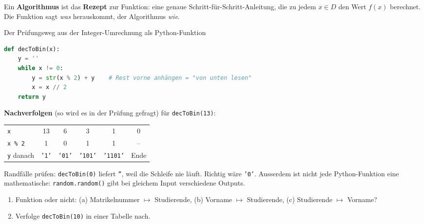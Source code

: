 \begin{merke}
  Ein \textbf{Algorithmus} ist das \textbf{Rezept} zur Funktion: eine genaue
  Schritt-für-Schritt-Anleitung, die zu jedem $x \in D$ den Wert $f(x)$ berechnet.
  Die Funktion sagt \emph{was} herauskommt, der Algorithmus \emph{wie}.
\end{merke}

\begin{beispiel}{Der Prüfungsweg aus der Integer-Umrechnung als Python-Funktion}
\begin{lstlisting}[language=Python]
def decToBin(x):
    y = ''
    while x != 0:
        y = str(x % 2) + y    # Rest vorne anhängen = "von unten lesen"
        x = x // 2
    return y
\end{lstlisting}
  \textbf{Nachverfolgen} (so wird es in der Prüfung gefragt) für \texttt{decToBin(13)}:\\[2pt]
  \begin{tabular}{lccccc}
    \toprule
    \texttt{x}          & 13 & 6 & 3 & 1 & 0 \\
    \texttt{x \% 2}     & 1 & 0 & 1 & 1 & -- \\
    \texttt{y} danach   & \texttt{'1'} & \texttt{'01'} & \texttt{'101'} & \texttt{'1101'} & Ende \\
    \bottomrule
  \end{tabular}
\end{beispiel}

\begin{fehler}
  Randfälle prüfen: \texttt{decToBin(0)} liefert \texttt{''}, weil die Schleife nie
  läuft. Richtig wäre \texttt{'0'}. Ausserdem ist nicht jede Python-Funktion eine
  mathematische: \texttt{random.random()} gibt bei gleichem Input verschiedene Outputs.
\end{fehler}

\begin{minicheck}
  \begin{enumerate}[resume*=fragen01]
    \item Funktion oder nicht: (a) Matrikelnummer $\mapsto$ Studierende,
          (b) Vorname $\mapsto$ Studierende, (c) Studierende $\mapsto$ Vorname?
    \item Verfolge \texttt{decToBin(10)} in einer Tabelle nach.
  \end{enumerate}
\end{minicheck}

